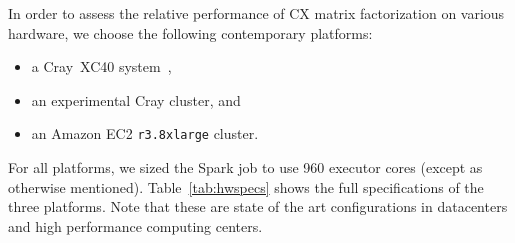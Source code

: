  In order to assess the relative performance of CX matrix factorization on various hardware, we choose the following contemporary platforms:
 \begin{itemize}
 \item a Cray\textregistered~XC40\textsuperscript{\tiny\texttrademark}
 system~\cite{alverson2012cray,craycascadesc12},
 \item an experimental Cray cluster, and
 \item an Amazon EC2 \texttt{r3.8xlarge} cluster.
 \end{itemize}
 For all platforms, we sized the Spark job to use 960 executor cores (except as otherwise mentioned).  Table~\ref{tab:hwspecs} shows the full specifications of the three platforms. Note that these are state of the art configurations in datacenters and high performance computing centers. 

